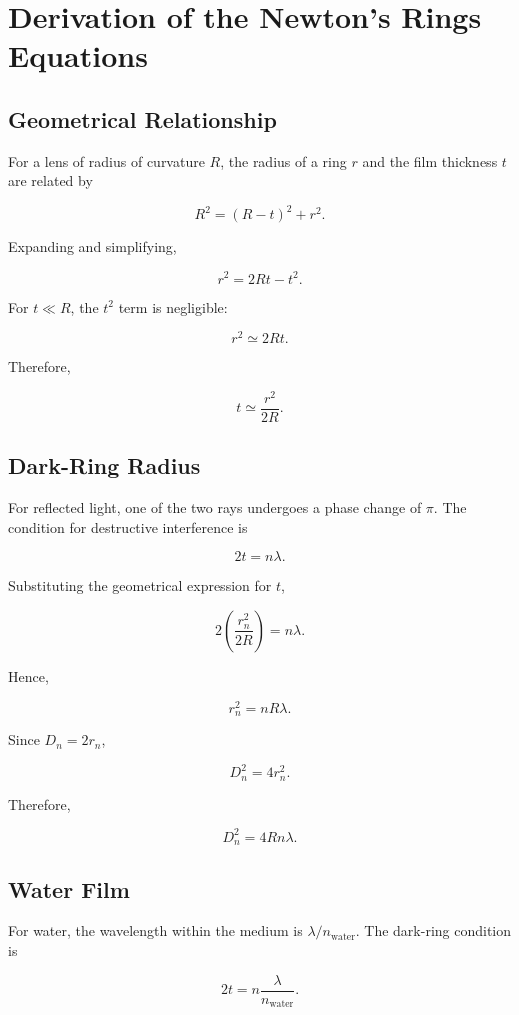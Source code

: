 \documentclass[12pt,a4paper]{article}
\begin{document}
\appendix
\section{Derivation of the Newton's Rings Equations}

\subsection{Geometrical Relationship}

For a lens of radius of curvature
$R$, the radius of a ring $r$
and the film thickness $t$
are related by

\[
R^2=(R-t)^2+r^2.
\]

Expanding and simplifying,

\[
r^2=2Rt-t^2.
\]

For $t\ll R$, the $t^2$ term
is negligible:

\[
r^2\simeq2Rt.
\]

Therefore,

\[
t\simeq\frac{r^2}{2R}.
\]

\subsection{Dark-Ring Radius}

For reflected light, one of
the two rays undergoes a
phase change of $\pi$.
The condition for destructive
interference is

\[
2t=n\lambda.
\]

Substituting the geometrical
expression for $t$,

\[
2\left(\frac{r_n^2}{2R}\right)
=n\lambda.
\]

Hence,

\[
r_n^2=nR\lambda.
\]

Since $D_n=2r_n$,

\[
D_n^2=4r_n^2.
\]

Therefore,

\[
\boxed{D_n^2=4Rn\lambda}.
\]

\subsection{Water Film}

For water, the wavelength
within the medium is
$\lambda/n_{\mathrm{water}}$.
The dark-ring condition is

\[
2t=n\frac{\lambda}{n_{\mathrm{water}}}.
\]
\end{document}
